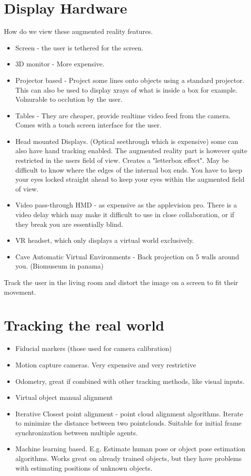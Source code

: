 \documentclass[a4paper]{article}
\begin{document}
\section{Display Hardware}
How do we view these augmented reality features. 
\begin{itemize}
	\item Screen - the user is tethered for the screen.
	\item 3D monitor - More expensive. 
	\item Projector based - Project some lines onto objects using a standard projector. This can also be used to display xrays of what is inside a box for example. Volnurable to occlution by the user. 
	\item Tables - They are cheaper, provide realtime video feed from the camera. Comes with a touch screen interface for the user. 
	\item Head mounted Displays. (Optical seethrough which is expensive) some can also have hand tracking enabled. The augmented reality part is however quite restricted in the users field of view. Creates a "letterbox effect". May be difficult to know where the edges of the internal box ends. You have to keep your eyes locked straight ahead to keep your eyes within the augmented field of view. 
	\item Video pass-through HMD - as expensive as the applevision pro. There is a video delay which may make it difficult to use in close collaboration, or if they break you are essentially blind. 
	\item VR headset, which only displays a virtual world exclusively. 
	\item Cave Automatic Virtual Environments - Back projection on 5 walls around you. (Biomuseum in panama)
\end{itemize}


Track the user in the living room and distort the image on a screen to fit their movement. 


\section{Tracking the real world}
\begin{itemize}
	\item Fiducial markers (those used for camera calibration)
	\item Motion capture cameras. Very expensive and very restrictive
	\item Odometry, great if combined with other tracking methods, like visual inputs. 
	\item Virtual object manual alignment 
	\item Iterative Closest point alignment - point cloud alignment algorithms. Iterate to minimize the distance between two pointclouds. Suitable for initial frame synchronization between multiple agents. 
	\item Machine learning based. E.g. Estimate human pose or object pose estimation algorithms. Works great on already trained objects, but they have problems with estimating positions of unknown objects. 
\end{itemize}
\end{document}

